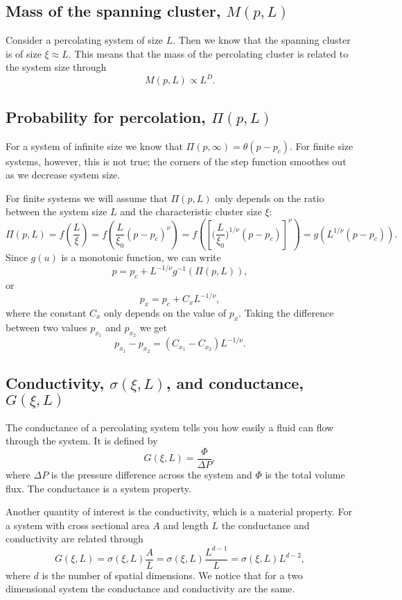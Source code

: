 \documentclass[12pt]{article}
\newcommand{\beq}{\begin{equation}}
\newcommand{\eeq}{\end{equation}}
\newcommand{\bdi}{\begin{displaymath}}
\newcommand{\edi}{\end{displaymath}}
\begin{document}
\subsection*{Mass of the spanning cluster, $M(p,L)$}
Consider a percolating system of size $L$. Then we know that the spanning cluster is of size $\xi \approx L$. This means that the mass of the percolating cluster is related to the
system size through
\beq
\label{eq:mass_perc}
M(p,L) \propto L^D.
\eeq



\subsection*{Probability for percolation, $\Pi(p,L)$}
For a system of infinite size we know that $\Pi(p,\infty) = \theta(p-p_c)$. For finite size systems, however, this is not true; the corners of the step function smoothes out as
we decrease system size.

For finite systems we will assume that  $\Pi(p,L)$ only depends on the ratio between the system size $L$ and the characteristic cluster size $\xi$:
\bdi
\Pi(p,L) = f(\frac{L}{\xi}) = f(\frac{L}{\xi_0}(p-p_c)^\nu) = f([\Big(\frac{L}{\xi_0}\Big)^{1/\nu}(p-p_c)]^\nu) = g(L^{1/\nu}(p-p_c)).
\edi
Since $g(u)$ is a monotonic function, we can write
\bdi
p = p_c + L^{-1/\nu}g^{-1}(\Pi(p,L)),
\edi
or
\beq
\label{eq:p_x}
p_x = p_c + C_xL^{-1/\nu},
\eeq
where the constant $C_x$ only depends on the value of $p_x$. Taking the difference between two values $p_{x_1}$ and $p_{x_2}$ we get
\beq
\label{eq:p_x_diff}
p_{x_1} - p_{x_2} = (C_{x_1} - C_{x_2})L^{-1/\nu}.
\eeq



\subsection*{Conductivity, $\sigma(\xi,L)$, and conductance, $G(\xi,L)$}
The conductance of a percolating system tells you how easily a fluid can flow through the system. It is defined by
\beq
\label{eq:conductance_def}
G(\xi,L) = \frac{\Phi}{\Delta P},
\eeq
where $\Delta P$ is the pressure difference across the system and $\Phi$ is the total volume flux. The conductance is a system property.

Another quantity of interest is the conductivity, which is a material property. For a system with cross sectional area $A$ and length $L$ the conductance and conductivity are related through
\bdi
G(\xi,L) = \sigma(\xi,L)\frac{A}{L} = \sigma(\xi,L)\frac{L^{d-1}}{L} = \sigma(\xi,L)L^{d-2},
\edi
where $d$ is the number of spatial dimensions. We notice that for a two dimensional system the conductance and conductivity are the same.
\end{document}
